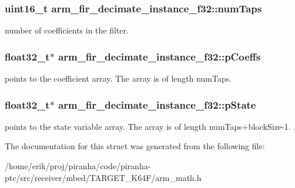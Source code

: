 \subsubsection[{\texorpdfstring{num\+Taps}{numTaps}}]{\setlength{\rightskip}{0pt plus 5cm}uint16\+\_\+t arm\+\_\+fir\+\_\+decimate\+\_\+instance\+\_\+f32\+::num\+Taps}\hypertarget{structarm__fir__decimate__instance__f32_a2aa2986129db8affef03ede88dd45a03}{}\label{structarm__fir__decimate__instance__f32_a2aa2986129db8affef03ede88dd45a03}
number of coefficients in the filter. 
\subsubsection[{\texorpdfstring{p\+Coeffs}{pCoeffs}}]{\setlength{\rightskip}{0pt plus 5cm}float32\+\_\+t$\ast$ arm\+\_\+fir\+\_\+decimate\+\_\+instance\+\_\+f32\+::p\+Coeffs}\hypertarget{structarm__fir__decimate__instance__f32_a268a8b0e80a3d9764baf33e4bc10dde2}{}\label{structarm__fir__decimate__instance__f32_a268a8b0e80a3d9764baf33e4bc10dde2}
points to the coefficient array. The array is of length num\+Taps. 
\subsubsection[{\texorpdfstring{p\+State}{pState}}]{\setlength{\rightskip}{0pt plus 5cm}float32\+\_\+t$\ast$ arm\+\_\+fir\+\_\+decimate\+\_\+instance\+\_\+f32\+::p\+State}\hypertarget{structarm__fir__decimate__instance__f32_a5bddf29aaaf2011d2e3bcec59a83f633}{}\label{structarm__fir__decimate__instance__f32_a5bddf29aaaf2011d2e3bcec59a83f633}
points to the state variable array. The array is of length num\+Taps+block\+Size-\/1. 

The documentation for this struct was generated from the following file\+:\begin{DoxyCompactItemize}
\item 
/home/erik/proj/piranha/code/piranha-\/ptc/src/receiver/mbed/\+T\+A\+R\+G\+E\+T\+\_\+\+K64\+F/arm\+\_\+math.\+h\end{DoxyCompactItemize}
